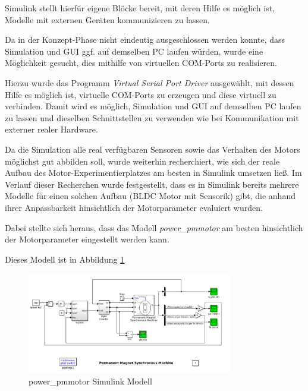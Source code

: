 Simulink stellt hierfür eigene Blöcke bereit, mit deren Hilfe es möglich ist, Modelle mit externen Geräten kommunizieren zu lassen.

Da in der Konzept-Phase nicht eindeutig ausgeschlossen werden konnte, dass Simulation und GUI ggf. auf demselben PC laufen würden, wurde eine Möglichkeit gesucht, dies mithilfe von virtuellen COM-Ports zu realisieren. 

Hierzu wurde das Programm \textit{Virtual Serial Port Driver} %
ausgewählt, mit dessen Hilfe es möglich ist, virtuelle COM-Ports zu erzeugen und diese virtuell zu verbinden. Damit wird es möglich, Simulation und GUI auf demselben PC laufen zu lassen und dieselben Schnittstellen zu verwenden wie bei Kommunikation mit externer realer Hardware.

Da die Simulation alle real verfügbaren Sensoren sowie das Verhalten des Motors möglichst gut abbilden soll, wurde weiterhin recherchiert, wie sich der reale Aufbau des Motor-Experimentierplatzes am besten in Simulink umsetzen ließ. Im Verlauf dieser Recherchen wurde festgestellt, dass es in Simulink bereits mehrere Modelle für einen solchen Aufbau (BLDC Motor mit Sensorik) gibt, die anhand ihrer Anpassbarkeit hinsichtlich der Motorparameter evaluiert wurden. 

Dabei stellte sich heraus, dass das Modell \textit{power\_pmmotor}
am besten hinsichtlich der Motorparameter eingestellt werden kann. 

Dieses Modell ist in Abbildung \ref{FigPowerPmmotor}
\begin{figure}[htbp]
	\centering
	\includegraphics[width=0.8\textwidth]{./sim/pictures/powerPmmotor.png}
	\caption{power\_pmmotor Simulink Modell}
	\label{FigPowerPmmotor}
\end{figure}

